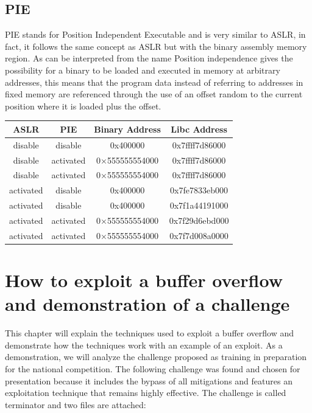     \subsection{PIE}
    PIE stands for Position Independent Executable and is very similar to ASLR, in fact, it follows the same concept as ASLR but with the binary assembly memory region.\newline
    As can be interpreted from the name Position independence gives the possibility for a binary to be loaded and executed in memory at arbitrary addresses, this means that the program data instead of referring to addresses in fixed memory are referenced through the use of an offset random to the current position where it is loaded plus the offset.
    
    \begin{table}[h] %
      \centering
      \begin{tabular}{|c|c|c|c|}
        \hline
        ASLR  & PIE & Binary Address & Libc Address \\
        \hline
        disable & disable  & 0x400000 & 0x7ffff7d86000 \\
        disable & activated   & 0×555555554000 & 0x7ffff7d86000 \\
        disable & activated   & 0×555555554000 & 0x7ffff7d86000 \\
        activated  & disable  &  0x400000 & 0x7fe7833eb000 \\
        activated  & disable  &  0x400000& 0x7f1a44191000 \\
        activated  & activated   & 0×555555554000 & 0x7f29d6ebd000 \\
        activated  & activated   & 0×555555554000 & 0x7f7d008a0000 \\
        \hline
      \end{tabular}
    \end{table}
    \clearpage

    \section{How to exploit a buffer overflow and demonstration of a challenge}
    This chapter will explain the techniques used to exploit a buffer overflow and demonstrate how the techniques work with an example of an exploit.\newline
    As a demonstration, we will analyze the challenge proposed as training in preparation for the national competition.\newline
    The following challenge was found and chosen for presentation because it includes the bypass of all mitigations and features an exploitation technique that remains highly effective.\newline
    The challenge is called terminator and two files are attached:

